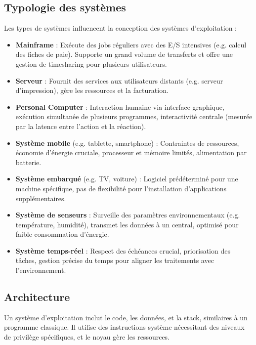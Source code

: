 \subsection{Typologie des systèmes}

Les types de systèmes influencent la conception des systèmes d'exploitation :

\begin{itemize}
    \item \textbf{Mainframe} : Exécute des jobs réguliers avec des E/S intensives (e.g. calcul des fiches de paie). Supporte un grand volume de transferts et offre une gestion de timesharing pour plusieurs utilisateurs.
    \item \textbf{Serveur} : Fournit des services aux utilisateurs distants (e.g. serveur d'impression), gère les ressources et la facturation.
    \item \textbf{Personal Computer} : Interaction humaine via interface graphique, exécution simultanée de plusieurs programmes, interactivité centrale (mesurée par la latence entre l'action et la réaction).
    \item \textbf{Système mobile} (e.g. tablette, smartphone) : Contraintes de ressources, économie d'énergie cruciale, processeur et mémoire limités, alimentation par batterie.
    \item \textbf{Système embarqué} (e.g. TV, voiture) : Logiciel prédéterminé pour une machine spécifique, pas de flexibilité pour l'installation d'applications supplémentaires.
    \item \textbf{Système de senseurs} : Surveille des paramètres environnementaux (e.g. température, humidité), transmet les données à un central, optimisé pour faible consommation d'énergie.
    \item \textbf{Système temps-réel} : Respect des échéances crucial, priorisation des tâches, gestion précise du temps pour aligner les traitements avec l'environnement.
\end{itemize}


\subsection{Architecture}

Un système d'exploitation inclut le code, les données, et la stack, similaires à un programme classique. Il utilise des instructions système nécessitant des niveaux de privilège spécifiques, et le noyau gère les ressources.

